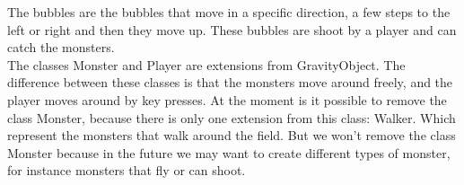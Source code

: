 The bubbles are the bubbles that move in a specific direction, a few steps to the left or right and then they move up. These bubbles are shoot by a player and can catch the monsters.\\
The classes Monster and Player are extensions from GravityObject. The difference between these classes is that the monsters move around freely, and the player moves around by key presses. At the moment is it possible to remove the class Monster, because there is only one extension from this class: Walker. Which represent the monsters that walk around the field. But we won't remove the class Monster because in the future we may want to create different types of monster, for instance monsters that fly or can shoot.